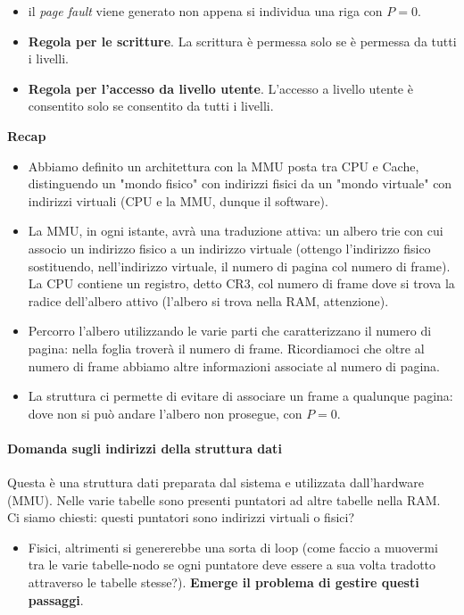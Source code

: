 \documentclass[11pt]{report}
\theoremstyle{definition}
\begin{document}
\begin{itemize}
	\item il \emph{page fault} viene generato non appena si individua una riga con $P=0$.
	\item \textbf{Regola per le scritture}. La scrittura è permessa solo se è permessa da tutti i livelli.
	\item \textbf{Regola per l'accesso da livello utente}. L'accesso a livello utente è consentito solo se consentito da tutti i livelli.
\end{itemize}
\begin{framed}
\noindent \textbf{Recap}
\begin{itemize}
	\item Abbiamo definito un architettura con la MMU posta tra CPU e Cache, distinguendo un "mondo fisico" con indirizzi fisici da un "mondo virtuale" con indirizzi virtuali (CPU e la MMU, dunque il software).
	\item La MMU, in ogni istante, avrà una traduzione attiva: un albero trie con cui associo un indirizzo fisico a un indirizzo virtuale (ottengo l'indirizzo fisico sostituendo, nell'indirizzo virtuale, il numero di pagina col numero di frame). La CPU contiene un registro, detto CR3, col numero di frame dove si trova la radice dell'albero attivo (l'albero si trova nella RAM, attenzione).
	\item Percorro l'albero utilizzando le varie parti che caratterizzano il numero di pagina: nella foglia troverà il numero di frame. Ricordiamoci che oltre al numero di frame abbiamo altre informazioni associate al numero di pagina.
	\item La struttura ci permette di evitare di associare un frame a qualunque pagina: dove non si può andare l'albero non prosegue, con $P=0$.
\end{itemize}   
\end{framed}
\paragraph{Domanda sugli indirizzi della struttura dati} Questa è una struttura dati preparata dal sistema e utilizzata dall'hardware (MMU). Nelle varie tabelle sono presenti puntatori ad altre tabelle nella RAM. Ci siamo chiesti: questi puntatori sono indirizzi virtuali o fisici? 
\begin{itemize}
	\item Fisici, altrimenti si genererebbe una sorta di loop (come faccio a muovermi tra le varie tabelle-nodo se ogni puntatore deve essere a sua volta tradotto attraverso le tabelle stesse?). \textbf{Emerge il problema di gestire questi passaggi}.
\end{itemize}
\end{document}

